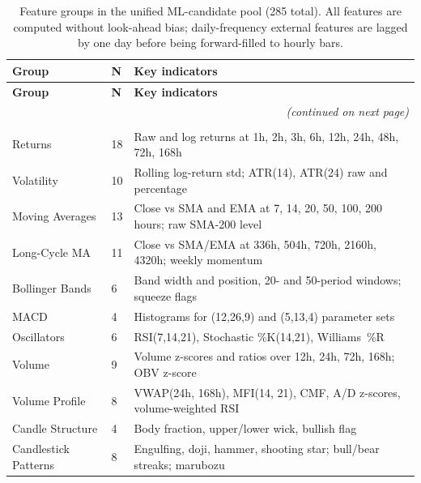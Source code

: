\small
\setlength{\LTleft}{0pt plus 1fill}
\setlength{\LTright}{0pt plus 1fill}
\begin{longtable}{ll>{\raggedright\arraybackslash\hyphenpenalty=10000\exhyphenpenalty=10000}p{7.5cm}}
    \caption{Feature groups in the unified ML-candidate pool (285 total). All features are computed without look-ahead bias; daily-frequency external features are lagged by one day before being forward-filled to hourly bars.}
    \label{tab:feature_groups}\\
        \toprule
        \textbf{Group} & \textbf{N} & \textbf{Key indicators} \\
        \midrule
        \endfirsthead
        \toprule
        \textbf{Group} & \textbf{N} & \textbf{Key indicators} \\
        \midrule
        \endhead
        \midrule
        \multicolumn{3}{r}{\textit{(continued on next page)}} \\
        \endfoot
        \bottomrule
        \endlastfoot
        \multicolumn{3}{l}{\textit{Technical (197 features from OHLCV)}} \\
        Returns              & 18 & Raw and log returns at 1h, 2h, 3h, 6h, 12h, 24h, 48h, 72h, 168h \\
        Volatility           & 10 & Rolling log-return std; ATR(14), ATR(24) raw and percentage \\
        Moving Averages      & 13 & Close vs SMA and EMA at 7, 14, 20, 50, 100, 200 hours; raw SMA-200 level \\
        Long-Cycle MA        & 11 & Close vs SMA/EMA at 336h, 504h, 720h, 2160h, 4320h; weekly momentum \\
        Bollinger Bands      & 6  & Band width and position, 20- and 50-period windows; squeeze flags \\
        MACD                 & 4  & Histograms for (12,26,9) and (5,13,4) parameter sets \\
        Oscillators          & 6  & RSI(7,14,21), Stochastic \%K(14,21), Williams~\%R \\
        Volume               & 9  & Volume z-scores and ratios over 12h, 24h, 72h, 168h; OBV z-score \\
        Volume Profile       & 8  & VWAP(24h, 168h), MFI(14, 21), CMF, A/D z-scores, volume-weighted RSI \\
        Candle Structure     & 4  & Body fraction, upper/lower wick, bullish flag \\
        Candlestick Patterns & 8  & Engulfing, doji, hammer, shooting star; bull/bear streaks; marubozu \\

\end{longtable}
